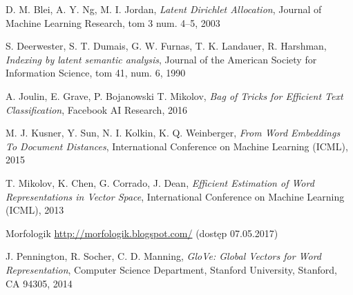 \documentclass[twoside,twocolumn]{article}
\begin{document}
	
	\begin{thebibliography}{99}
		D. M. Blei, A. Y. Ng, M. I. Jordan,
		\emph{Latent Dirichlet Allocation},
		Journal of Machine Learning Research, tom 3 num. 4–5,
		2003
		
		S. Deerwester, S. T. Dumais, G. W. Furnas, T. K. Landauer, R. Harshman,
		\emph{Indexing by latent semantic analysis},
		Journal of the American Society for Information Science, tom 41, num. 6,
		1990
		
		A. Joulin, E. Grave, P. Bojanowski T. Mikolov,
		\emph{Bag of Tricks for Efficient Text Classification},
		Facebook AI Research,
		2016
		
		M. J. Kusner, Y. Sun, N. I. Kolkin, K. Q. Weinberger,
		\emph{From Word Embeddings To Document Distances},
		International Conference on Machine Learning (ICML),
		2015
		
		T. Mikolov, K. Chen, G. Corrado, J. Dean,
		\emph{Efficient Estimation of Word Representations in Vector Space},
		International Conference on Machine Learning (ICML),
		2013
		
		Morfologik
		\url{http://morfologik.blogspot.com/}
		(dostęp 07.05.2017)
		
		J. Pennington, R. Socher, C. D. Manning,
		\emph{GloVe: Global Vectors for Word Representation},
		Computer Science Department, Stanford University, Stanford, CA 94305,
		2014

		
	\end{thebibliography}
	
	
\end{document}
